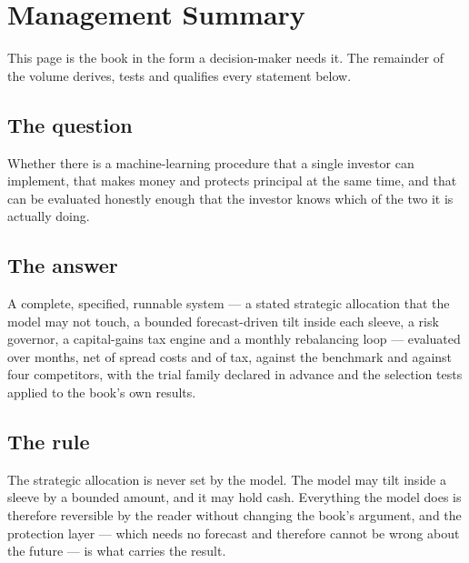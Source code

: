 \clearpage
\thispagestyle{plain}
\listoftables
{}
\clearpage

\setcounter{secnumdepth}{-1}
\chapter*{Management Summary}
\thispagestyle{plain}

This page is the book in the form a decision-maker needs it. The remainder
of the volume derives, tests and qualifies every statement below.

\section*{The question}

Whether there is a machine-learning procedure that a single investor can
implement, that makes money and protects principal at the same time, and
that can be evaluated honestly enough that the investor knows which of the
two it is actually doing.

\section*{The answer}

A complete, specified, runnable system --- a stated strategic allocation
that the model may not touch, a bounded forecast-driven tilt inside each
sleeve, a risk governor, a capital-gains tax engine and a monthly
rebalancing loop --- evaluated over \numRecordMonths{} months, net of
spread costs and of tax, against the benchmark and against four
competitors, with the trial family declared in advance and the selection
tests applied to the book's own results.

\section*{The rule}

The strategic allocation is never set by the model. The model may tilt
inside a sleeve by a bounded amount, and it may hold cash. Everything the
model does is therefore reversible by the reader without changing the
book's argument, and the protection layer --- which needs no forecast and
therefore cannot be wrong about the future --- is what carries the result.

